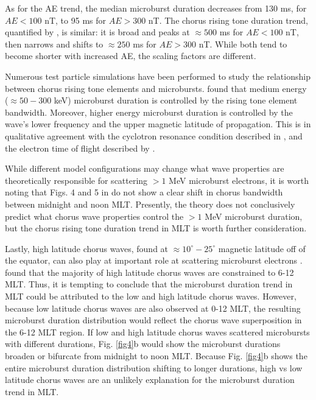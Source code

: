 \documentclass[draft]{agujournal2019}
\begin{document}
As for the AE trend, the median microburst duration decreases from 130 ms, for $AE < 100$ nT, to 95 ms for $AE > 300$ nT. The chorus rising tone duration trend, quantified by , is similar: it is broad and peaks at $\approx 500$ ms for $AE < 100$ nT, then narrows and shifts to $\approx 250$ ms for $AE > 300$ nT. While both tend to become shorter with increased AE, the scaling factors are different.

Numerous test particle simulations have been performed to study the relationship between chorus rising tone elements and microbursts.  found that medium energy ($\approx 50-300$ keV) microburst duration is controlled by the rising tone element bandwidth. Moreover, higher energy microburst duration is controlled by the wave's lower frequency and the upper magnetic latitude of propagation. This is in qualitative agreement with the cyclotron resonance condition described in , and the electron time of flight described by .

While different model configurations may change what wave properties are theoretically responsible for scattering $>1$ MeV microburst electrons, it is worth noting that Figs. 4 and 5 in  do not show a clear shift in chorus bandwidth between midnight and noon MLT. Presently, the theory does not conclusively predict what chorus wave properties control the $> 1$ MeV microburst duration, but the chorus rising tone duration trend in MLT is worth further consideration.

Lastly, high latitude chorus waves, found at $\approx 10^\circ-25^\circ$ magnetic latitude off of the equator, can also play at important role at scattering microburst electrons \cite{Lorentzen2001a}.  found that the majority of high latitude chorus waves are constrained to 6-12 MLT. Thus, it is tempting to conclude that the microburst duration trend in MLT could be attributed to the low and high latitude chorus waves. However, because low latitude chorus waves are also observed at 0-12 MLT, the resulting microburst duration distribution would reflect the chorus wave superposition in the 6-12 MLT region. If low and high latitude chorus waves scattered microbursts with different durations, Fig. \ref{fig4}b would show the microburst durations broaden or bifurcate from midnight to noon MLT. Because Fig. \ref{fig4}b shows the entire microburst duration distribution shifting to longer durations, high vs low latitude chorus waves are an unlikely explanation for the microburst duration trend in MLT.
\end{document}
